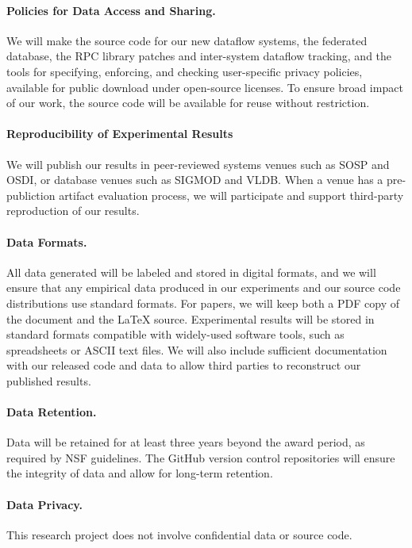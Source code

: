 \paragraph{Policies for Data Access and Sharing.}
We will make the source code for our new dataflow systems, the federated
database, the RPC library patches and inter-system dataflow tracking, and
the tools for specifying, enforcing, and checking user-specific privacy
policies, available for public download under open-source licenses.
%
To ensure broad impact of our work, the source code will be available for reuse
without restriction.
%

\paragraph{Reproducibility of Experimental Results}
%
We will publish our results in peer-reviewed systems venues such as SOSP and
OSDI, or database venues such as SIGMOD and VLDB.
%
When a venue has a pre-publiction artifact evaluation process, we will
participate and support third-party reproduction of our results.
%

\paragraph{Data Formats.}
All data generated will be labeled and stored in digital formats, and we will
ensure that any empirical data produced in our experiments and our source code
distributions use standard formats.
%
For papers, we will keep both a PDF copy of the document and the {\LaTeX}
source.
%
Experimental results will be stored in standard formats compatible with
widely-used software tools, such as spreadsheets or ASCII text files.
%
We will also include sufficient documentation with our released code and data
to allow third parties to reconstruct our published results.
%

\paragraph{Data Retention.}
Data will be retained for at least three years beyond the award period, as
required by NSF guidelines.
%
The GitHub version control repositories will ensure the integrity of data and
allow for long-term retention.
%

\paragraph{Data Privacy.}
This research project does not involve confidential data or source code.

